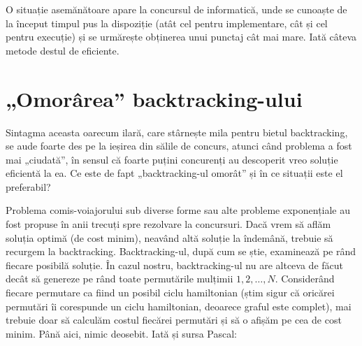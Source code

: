 O situație asemănătoare apare la concursul de informatică, unde se cunoaște de
la început timpul pus la dispoziție (atât cel pentru implementare, cât și cel
pentru execuție) și se urmărește obținerea unui punctaj cât mai mare. Iată
câteva metode destul de eficiente.

\section{„Omorârea” backtracking-ului}

Sintagma aceasta oarecum ilară, care stârnește mila pentru bietul
backtracking, se aude foarte des pe la ieșirea din sălile de concurs, atunci
când problema a fost mai „ciudată”, în sensul că foarte puțini concurenți au
descoperit vreo soluție eficientă la ea. Ce este de fapt „backtracking-ul
omorât” și în ce situații este el preferabil?

Problema comis-voiajorului sub diverse forme sau alte probleme exponențiale au
fost propuse în anii trecuți spre rezolvare la concursuri. Dacă vrem să aflăm
soluția optimă (de cost minim), neavând altă soluție la îndemână, trebuie să
recurgem la backtracking. Backtracking-ul, după cum se știe, examinează pe
rând fiecare posibilă soluție. În cazul nostru, backtracking-ul nu are altceva
de făcut decât să genereze pe rând toate permutările mulțimii ${1, 2, \dots,
  N}$. Considerând fiecare permutare ca fiind un posibil ciclu hamiltonian
(știm sigur că oricărei permutări îi corespunde un ciclu hamiltonian, deoarece
graful este complet), mai trebuie doar să calculăm costul fiecărei permutări
și să o afișăm pe cea de cost minim. Până aici, nimic deosebit. Iată și sursa
Pascal:

